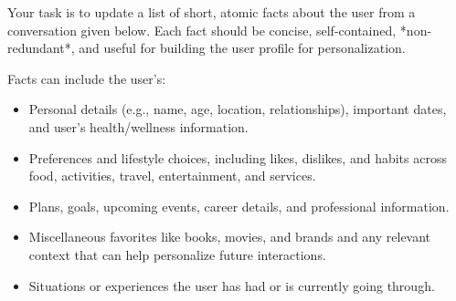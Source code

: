 \begin{promptbox}
Your task is to update a list of short, atomic facts about the user from a conversation given below.  
Each fact should be concise, self-contained, *non-redundant*, and useful for building the user profile for personalization.

Facts can include the user's:
\begin{itemize}
  \item Personal details (e.g., name, age, location, relationships), important dates, and user's health/wellness information. 
  \item Preferences and lifestyle choices, including likes, dislikes, and habits across food, activities, travel, entertainment, and services.
  \item Plans, goals, upcoming events, career details, and professional information.
  \item Miscellaneous favorites like books, movies, and brands and any relevant context that can help personalize future interactions.
  \item Situations or experiences the user has had or is currently going through.
\end{itemize}


\end{promptbox}
